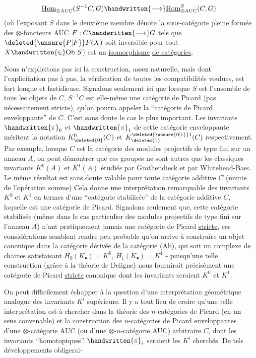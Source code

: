 \[
\underline{\mathrm{Hom}}_{\otimes\mathrm{AUC}}(S^{-1}C,G)\handwritten{\longrightarrow}\underline{\mathrm{Hom}}_{\otimes\mathrm{AUC}}^{S}(C,G)
\]
(où l'exposant $S$ dans le deuxième membre dénote la sous-catégorie pleine formée des $\otimes$-foncteurs AUC $F:C\handwritten{\longrightarrow}G$ tels que $\deleted{\unsure{P|F}}F(X)$ soit inversible pour tout $X\handwritten{\in}\mathrm{Ob}\ S$) est un \uline{isomorphisme} \uline{de catégories}.

Nous n'explicitons pas ici la construction, assez naturelle, mais dont l'explicitation pas à pas,  la vérification de toutes les compatibilités voulues, est fort longue et fastidieuse. Signalons seulement ici que lorsque $S$ est l'ensemble de tous les objets de $C$, $S^{-1}C$ est elle-même une catégorie de Picard (pas nécessairement stricte), qu'on pourra appeler la ``catégorie de Picard enveloppante'' de $C$. C'est sans doute le cas le plus important. Les invariants $\handwritten{\pi}_{0}$ et $\handwritten{\pi}_{1}$ de cette catégorie enveloppante méritent la notation $K^{0}_{\deleted{0}}(C)$ et $K^{\deleted{\unsure{0|1}}1}_{\deleted{1}}(C)$ respectivement. Par exemple, lorsque $C$ est la catégorie des modules projectifs de type fini sur un anneau $A$,  on peut démontrer que ces groupes ne sont autres que les classiques invariants $K^{0}(A)$ et $K^{1}(A)$ étudiés par Grothendieck et par Whitehead-Bass. Le même résultat est sans doute valable pour toute catégorie additive $C$ (munie de  l'opération somme) Cela donne une interprétation remarquable des invariants $K^{0}$ et $K^{1}$ en termes d'une ``catégorie stabilisée'' \handwritten{(}de la catégorie additive $C$\handwritten{)}, laquelle est une catégorie de Picard. Signalons seulement que, cette catégorie stabilisée (même dans le cas particulier des modules projectifs de type fini sur l'anneau $A$) n'ant pratiquement jamais une catégorie de Picard \uline{stricte}, ces considérations semblent rendre peu probable qu'on arrive à construire un objet canonique dans la catégorie dérivée de la catégorie (Ab), qui soit un complexe de chaines satisfaisant $H_{0}(K_{\bullet})=K^{0}$, $H_{1}(K_{\bullet})=K^{1}$ - puisqu'une telle construction (grâce à la théorie de Deligne) nous fournirait précisément une catégorie de Picard \uline{stricte} canonique dont les invariants seraient $K^{0}$ et $K^{1}$.

On peut difficilement échapper à la question d'une interprétation géométrique analogue des invariants $K^{i}$ supérieurs. Il y a tout lieu de croire qu'une telle interprétation est à chercher dans la théorie des $n$-catégories de Picard (en un sens convenable) et la construction des $n$-catégories de Picard enveloppantes d'une $\otimes$-catégorie AUC (ou d'une $\otimes$-$n$-catégorie AUC) arbitraire $C$, dont les invariants ``homotopiques'' $\handwritten{\pi}_{i}$ seraient les $K^{i}$ cherchés. De tels développements obligerai-

